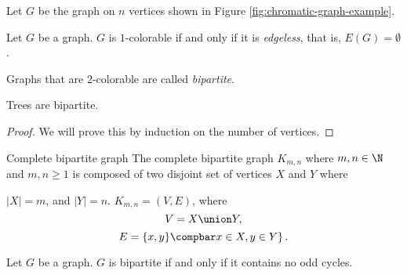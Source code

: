 \documentclass[12pt]{article}
\begin{document}
\begin{exmp}
    Let $G$ be the graph on $n$ vertices shown in Figure \ref{fig:chromatic-graph-example}.
\end{exmp}

\begin{prop}
    Let $G$ be a graph. $G$ is $1$-colorable if and only if it is \emph{edgeless}, that is, $E(G) = \emptyset$.
\end{prop}

\begin{defn}
    Graphs that are $2$-colorable are called \emph{bipartite}.
\end{defn}

\begin{prop}
    Trees are bipartite.
\end{prop}

\begin{proof}
    We will prove this by induction on the number of vertices.
\end{proof}

\begin{defn}Complete bipartite graph\proofbreak
    The complete bipartite graph $K_{m,n}$ where $m,n \in \N$ and $m,n \geq 1$ is composed of two disjoint set of vertices $X$ and $Y$ where \item $|X| = m$, and $|Y| = n$. $K_{m,n} = (V, E)$, where
    \[V = X \union Y,\]
    \[E = \left\{x, y\} \compbar x \in X, y \in Y \right\}.\]
\end{defn}

\begin{thm}
    Let $G$ be a graph. $G$ is bipartite if and only if it contains no odd cycles.
\end{thm}
\end{document}
